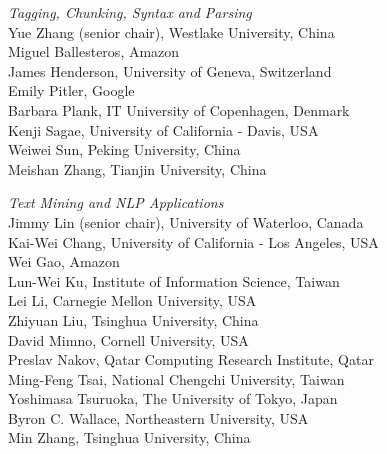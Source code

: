 \emph{Tagging, Chunking, Syntax and Parsing} \\
\hspace*{0.2in}Yue Zhang (senior chair), Westlake University, China \\ 
\hspace*{0.2in}Miguel Ballesteros, Amazon \\
\hspace*{0.2in}James Henderson, University of Geneva, Switzerland \\
\hspace*{0.2in}Emily Pitler, Google \\
\hspace*{0.2in}Barbara Plank, IT University of Copenhagen, Denmark \\
\hspace*{0.2in}Kenji Sagae, University of California - Davis, USA \\
\hspace*{0.2in}Weiwei Sun, Peking University, China \\
\hspace*{0.2in}Meishan Zhang, Tianjin University, China


\emph{Text Mining and NLP Applications} \\
\hspace*{0.2in}Jimmy Lin (senior chair), University of Waterloo, Canada \\
\hspace*{0.2in}Kai-Wei Chang, University of California - Los Angeles, USA \\
\hspace*{0.2in}Wei Gao, Amazon \\
\hspace*{0.2in}Lun-Wei Ku, Institute of Information Science, Taiwan \\
\hspace*{0.2in}Lei Li, Carnegie Mellon University, USA \\
\hspace*{0.2in}Zhiyuan Liu, Tsinghua University, China \\
\hspace*{0.2in}David Mimno, Cornell University, USA \\
\hspace*{0.2in}Preslav Nakov, Qatar Computing Research Institute, Qatar \\
\hspace*{0.2in}Ming-Feng Tsai, National Chengchi University, Taiwan \\
\hspace*{0.2in}Yoshimasa Tsuruoka, The University of Tokyo, Japan \\
\hspace*{0.2in}Byron C. Wallace, Northeastern University, USA \\
\hspace*{0.2in}Min Zhang, Tsinghua University, China


